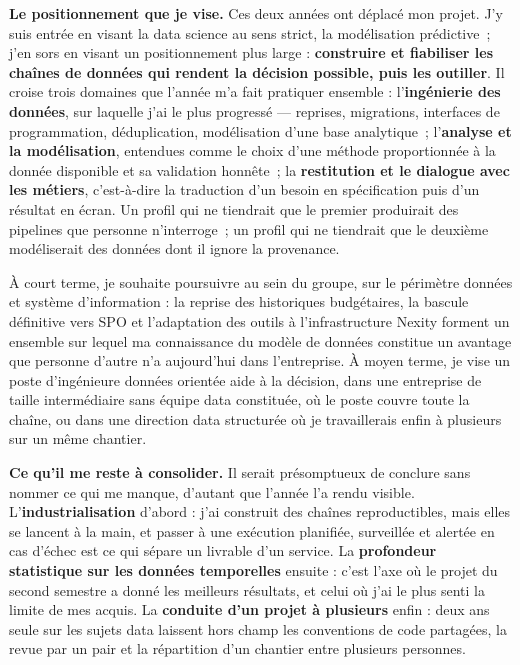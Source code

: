 \textbf{Le positionnement que je vise.} Ces deux années ont déplacé mon projet. J'y suis entrée en
visant la data science au sens strict, la modélisation prédictive~; j'en sors en visant un
positionnement plus large : \textbf{construire et fiabiliser les chaînes de données qui rendent la
décision possible, puis les outiller}. Il croise trois domaines que l'année m'a fait pratiquer
ensemble : l'\textbf{ingénierie des données}, sur laquelle j'ai le plus progressé --- reprises,
migrations, interfaces de programmation, déduplication, modélisation d'une base analytique~;
l'\textbf{analyse et la modélisation}, entendues comme le choix d'une méthode proportionnée à la
donnée disponible et sa validation honnête~; la \textbf{restitution et le dialogue avec les
métiers}, c'est-à-dire la traduction d'un besoin en spécification puis d'un résultat en écran.
Un profil qui ne tiendrait que le premier produirait des pipelines que personne n'interroge~;
un profil qui ne tiendrait que le deuxième modéliserait des données dont il ignore la
provenance.

À court terme, je souhaite poursuivre au sein du groupe, sur le périmètre données et système
d'information : la reprise des historiques budgétaires, la bascule définitive vers SPO et
l'adaptation des outils à l'infrastructure Nexity forment un ensemble sur lequel ma
connaissance du modèle de données constitue un avantage que personne d'autre n'a aujourd'hui
dans l'entreprise. À moyen terme, je vise un poste d'ingénieure données orientée aide à la
décision, dans une entreprise de taille intermédiaire sans équipe data constituée, où le poste
couvre toute la chaîne, ou dans une direction data structurée où je travaillerais enfin à
plusieurs sur un même chantier.

\textbf{Ce qu'il me reste à consolider.} Il serait présomptueux de conclure sans nommer ce qui me
manque, d'autant que l'année l'a rendu visible. L'\textbf{industrialisation} d'abord : j'ai
construit des chaînes reproductibles, mais elles se lancent à la main, et passer à une
exécution planifiée, surveillée et alertée en cas d'échec est ce qui sépare un livrable d'un
service. La \textbf{profondeur statistique sur les données temporelles} ensuite : c'est l'axe où le
projet du second semestre a donné les meilleurs résultats, et celui où j'ai le plus senti la
limite de mes acquis. La \textbf{conduite d'un projet à plusieurs} enfin : deux ans seule sur les
sujets data laissent hors champ les conventions de code partagées, la revue par un pair et la
répartition d'un chantier entre plusieurs personnes.
